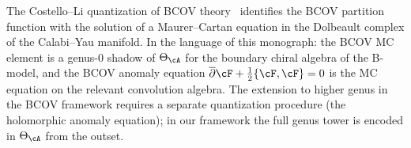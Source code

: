 \begin{remark}
\label{rem:costello-bcov}
The Costello--Li quantization of BCOV theory~\cite{CL16,CL20}
identifies the BCOV partition function with the solution of a
Maurer--Cartan equation in the Dolbeault complex of the
Calabi--Yau manifold. In the language of this monograph:
the BCOV MC element is a genus-$0$ shadow of
$\Theta_\cA$ for the boundary chiral algebra of the
B-model, and the BCOV anomaly equation
$\overline{\partial} \cF + \tfrac{1}{2}\{\cF, \cF\} = 0$
is the MC equation on the relevant convolution algebra.
The extension to higher genus in the BCOV framework requires
a separate quantization procedure (the holomorphic anomaly
equation); in our framework the full genus tower is encoded
in $\Theta_\cA$ from the outset.
\end{remark}

